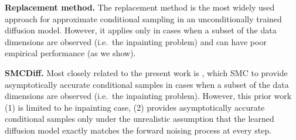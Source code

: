 \textbf{Replacement method.}
The replacement method \citep{song2020score} is the most widely used approach for approximate conditional sampling in an unconditionally trained diffusion model.
However, it applies only in cases when a subset of the data dimensions are observed (i.e.\ the inpainting problem) and can have poor empirical performance (as we show).

\textbf{SMCDiff.}
Most closely related to the present work is \citet{trippe2022diffusion},
which SMC to provide asymptotically accurate conditional samples in cases when a subset of the data dimensions are observed (i.e.\ the inpainting problem).
However, this prior work 
(1) is limited to he inpainting case,
(2) provides asymptotically accurate conditional samples only under the unrealistic assumption that the learned diffusion model exactly matches the forward noising process at every step. 


